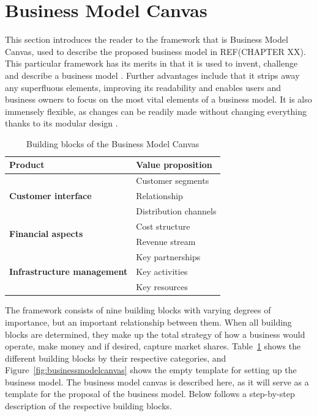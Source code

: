 \section{Business Model Canvas}
This section introduces the reader to the framework that is Business Model Canvas, used to describe the proposed business model in REF(CHAPTER XX). This particular framework has its merits in that it is used to invent, challenge and describe a business model \cite{strategyzer2016}. Further advantages include that it strips away any superfluous elements, improving its readability and enables users and business owners to focus on the most vital elements of a business model. It is also immensely flexible, as changes can be readily made without changing everything thanks to its modular design \cite{osterwalder2013business}. 
\newline
\\
\begin{table}[H]
\centering
\caption{Building blocks of the Business Model Canvas}
\label{tab:canvas}
\begin{tabular}{|l|l|}
\hline
\textbf{Product}                                    & Value proposition     \\ \hline
\multirow{3}{*}{\textbf{Customer interface}}        & Customer segments     \\ \cline{2-2} 
                                                    & Relationship          \\ \cline{2-2} 
                                                    & Distribution channels \\ \hline
\multirow{2}{*}{\textbf{Financial aspects}}         & Cost structure        \\ \cline{2-2} 
                                                    & Revenue stream        \\ \hline
\multirow{3}{*}{\textbf{Infrastructure management}} & Key partnerships      \\ \cline{2-2} 
                                                    & Key activities        \\ \cline{2-2} 
                                                    & Key resources         \\ \hline
\end{tabular}
\end{table}

The framework consists of nine building blocks with varying degrees of importance, but an important relationship between them. When all building blocks are determined, they make up the total strategy of how a business would operate, make money and if desired, capture market shares. Table~\ref{tab:canvas} shows the different building blocks by their respective categories, and Figure~\ref{fig:businessmodelcanvas} shows the empty template for setting up the business model. The business model canvas is described here, as it will serve as a template for the proposal of the business model. Below follows a step-by-step description of the respective building blocks.


